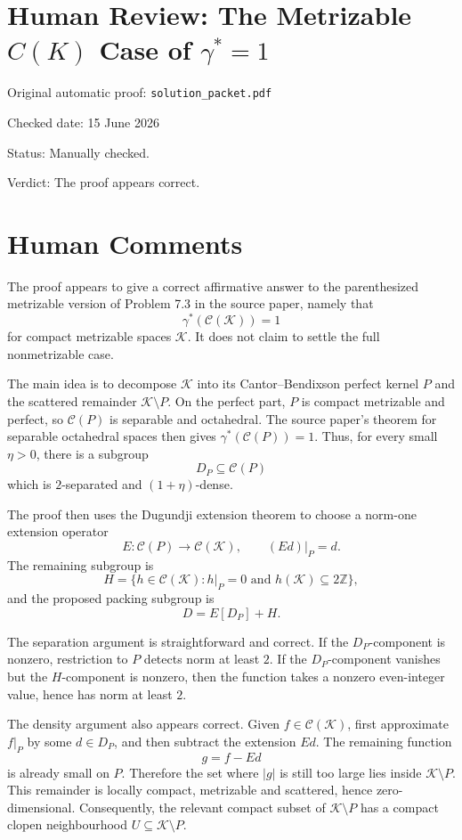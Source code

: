 ﻿\documentclass[11pt]{article}
\newcommand{\C}{\mathcal C}
\newcommand{\K}{\mathcal K}
\newcommand{\Z}{\mathbb Z}
\begin{document}
\section*{Human Review: The Metrizable \texorpdfstring{$C(K)$}{C(K)} Case of \texorpdfstring{$\gamma^*=1$}{gamma-star equals one}}

\noindent Original automatic proof: \texttt{solution\_packet.pdf}

\noindent Checked date: 15 June 2026

\noindent Status: Manually checked.

\noindent Verdict: The proof appears correct.

\section*{Human Comments}

The proof appears to give a correct affirmative answer to the parenthesized metrizable version of Problem 7.3 in the source paper, namely that
\[
  \gamma^*(\C(\K))=1
\]
for compact metrizable spaces \(\K\). It does not claim to settle the full nonmetrizable case.

The main idea is to decompose \(\K\) into its Cantor--Bendixson perfect kernel \(P\) and the scattered remainder \(\K\setminus P\). On the perfect part, \(P\) is compact metrizable and perfect, so \(\C(P)\) is separable and octahedral. The source paper's theorem for separable octahedral spaces then gives \(\gamma^*(\C(P))=1\). Thus, for every small \(\eta>0\), there is a subgroup
\[
  D_P\subseteq \C(P)
\]
which is \(2\)-separated and \((1+\eta)\)-dense.

The proof then uses the Dugundji extension theorem to choose a norm-one extension operator
\[
  E:\C(P)\longrightarrow \C(\K),
  \qquad (Ed)|_P=d.
\]
The remaining subgroup is
\[
  H=\{h\in \C(\K): h|_P=0 \text{ and } h(\K)\subseteq 2\Z\},
\]
and the proposed packing subgroup is
\[
  D=E[D_P]+H.
\]

The separation argument is straightforward and correct. If the \(D_P\)-component is nonzero, restriction to \(P\) detects norm at least \(2\). If the \(D_P\)-component vanishes but the \(H\)-component is nonzero, then the function takes a nonzero even-integer value, hence has norm at least \(2\).

The density argument also appears correct. Given \(f\in \C(\K)\), first approximate \(f|_P\) by some \(d\in D_P\), and then subtract the extension \(Ed\). The remaining function
\[
  g=f-Ed
\]
is already small on \(P\). Therefore the set where \(|g|\) is still too large lies inside \(\K\setminus P\). This remainder is locally compact, metrizable and scattered, hence zero-dimensional. Consequently, the relevant compact subset of \(\K\setminus P\) has a compact clopen neighbourhood \(U\subseteq \K\setminus P\).
\end{document}

